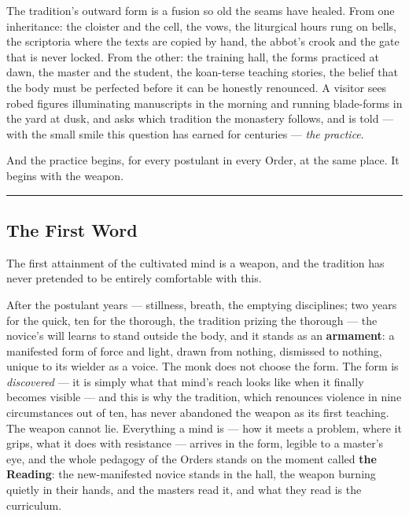 The tradition's outward form is a fusion so old the seams have healed. From one inheritance: the cloister and the cell, the vows, the liturgical hours rung on bells, the scriptoria where the texts are copied by hand, the abbot's crook and the gate that is never locked. From the other: the training hall, the forms practiced at dawn, the master and the student, the koan-terse teaching stories, the belief that the body must be perfected before it can be honestly renounced. A visitor sees robed figures illuminating manuscripts in the morning and running blade-forms in the yard at dusk, and asks which tradition the monastery follows, and is told --- with the small smile this question has earned for centuries --- \textit{the practice}.

And the practice begins, for every postulant in every Order, at the same place. It begins with the weapon.

\medskip\hrule\medskip

\subsection{The First Word}

The first attainment of the cultivated mind is a weapon, and the tradition has never pretended to be entirely comfortable with this.

After the postulant years --- stillness, breath, the emptying disciplines; two years for the quick, ten for the thorough, the tradition prizing the thorough --- the novice's will learns to stand outside the body, and it stands as an \textbf{armament}: a manifested form of force and light, drawn from nothing, dismissed to nothing, unique to its wielder as a voice. The monk does not choose the form. The form is \textit{discovered} --- it is simply what that mind's reach looks like when it finally becomes visible --- and this is why the tradition, which renounces violence in nine circumstances out of ten, has never abandoned the weapon as its first teaching. The weapon cannot lie. Everything a mind is --- how it meets a problem, where it grips, what it does with resistance --- arrives in the form, legible to a master's eye, and the whole pedagogy of the Orders stands on the moment called \textbf{the Reading}: the new-manifested novice stands in the hall, the weapon burning quietly in their hands, and the masters read it, and what they read is the curriculum.

